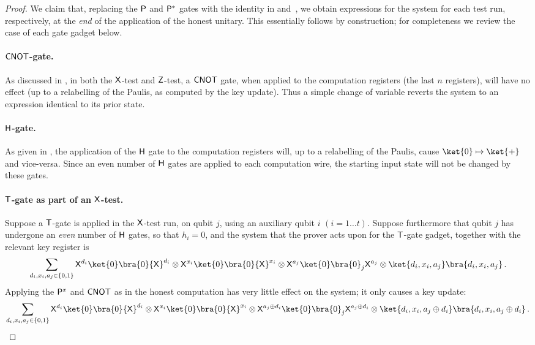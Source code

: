 \documentclass{toc}
\newcommand{\hgate}{{\sf H}}
\newcommand{\pgate}{{\sf P}}
\newcommand{\tgate}{{\sf T}}
\newcommand{\xgate}{{\sf X}}
\newcommand{\zgate}{{\sf Z}}
\newcommand{\cnot}{{\sf CNOT}}
\newcommand{\ketbra}[2]{\ket{#1}\bra{#2}}			%
\newcommand{\egoketbra}[1]{\ketbra{#1}{#1}}			%
\begin{document}
\begin{proof}
We claim that, replacing the $\pgate$ and $\pgate^*$ gates with the identity in  and~, we obtain expressions for the system for each test run, respectively, at the \emph{end} of the application of the honest unitary. This essentially follows by construction; for completeness we review the case of each gate gadget below.

 \paragraph{$\cnot$-gate.}
 As discussed in , in both the $\xgate$-test and $\zgate$-test, a $\cnot$ gate, when applied to the computation registers (the last $n$ registers), will have no effect %
 (up to a relabelling of the Paulis, %
 as computed by the key update). %
  Thus a simple change of variable reverts the system to an expression identical to its prior state.
%
\paragraph{$\hgate$-gate.} As given in , the application of the $\hgate$ gate to the computation registers will, up to a relabelling of the Paulis, cause $\ket{0} \mapsto \ket{+}$ and vice-versa. Since an even number of $\hgate$ gates are applied to each computation wire, the starting input state will not be changed by these gates.


 \paragraph{$\tgate$-gate as part of an $\xgate$-test.}
\label{sec:t-gate-x-test}

Suppose a $\tgate$-gate is applied in the $\xgate$-test run, on qubit $j$, using an auxiliary qubit  $i$ $(i = 1 \ldots t)$. Suppose furthermore that qubit $j$ has undergone an \emph{even} number of $\hgate$ gates, so that %
%
$h_i=0$, and the system that the prover acts upon for the $\tgate$-gate gadget, together with the relevant key register is %
%
\begin{equation}
\label{eq:start-x-test}
\sum_{d_i,x_i,a_j \in \{0,1\}} \xgate^{d_i}\egoketbra{0}\xgate^{d_i} \otimes \xgate^{x_i}\egoketbra{0}\xgate^{x_i} \otimes \xgate^{a_j}\egoketbra{0}_j\xgate^{a_j} \otimes \egoketbra{d_i, x_i, a_j}\,.
\end{equation}
Applying the $\pgate^x$ and $\cnot$ as in the honest computation has very little effect on the system; it only causes a key update:
\begin{equation}
\sum_{d_i,x_i,a_j \in \{0,1\}} \xgate^{d_i}\egoketbra{0}\xgate^{d_i} \otimes \xgate^{x_i}\egoketbra{0}\xgate^{x_i} \otimes \xgate^{{a_j\oplus {d_i}}}\egoketbra{0}_j\xgate^{a_j \oplus d_i}\otimes \egoketbra{d_i, x_i, a_j \oplus d_i}\,.
\end{equation}


\end{proof}
\end{document}
